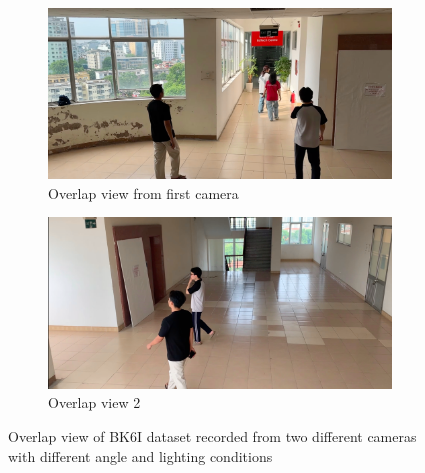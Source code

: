 \begin{figure}[htbp]
    \centering
    \begin{subfigure}[b]{0.48\textwidth}
        \centering
        \includegraphics[width=\textwidth]{Figure/overlap_1.png}
        \caption{Overlap view from first camera}
        \label{fig:overlap1}
    \end{subfigure}
    \hfill
    \begin{subfigure}[b]{0.48\textwidth}
        \centering
        \includegraphics[width=\textwidth]{Figure/overlap_2.png}
        \caption{Overlap view 2}
        \label{fig:overlap2}
    \end{subfigure}
    \caption{Overlap view of BK6I dataset recorded from two different cameras with different angle and lighting conditions}
    \label{fig:overlap}
\end{figure}


